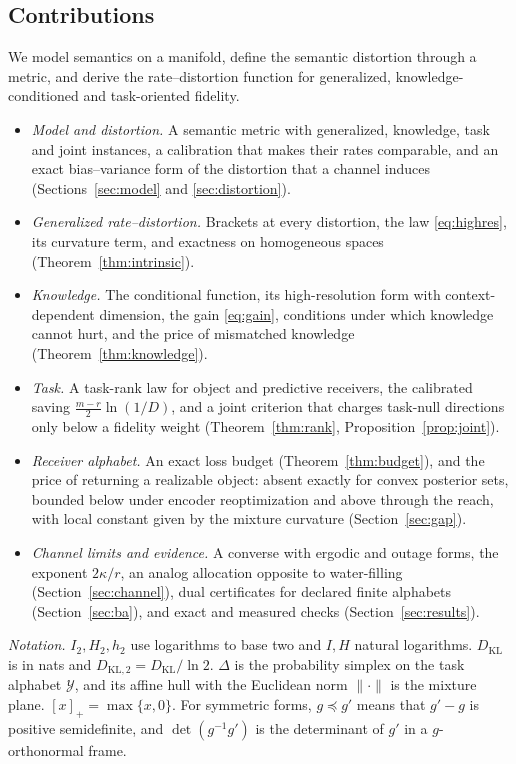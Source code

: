 \documentclass[10pt,journal]{IEEEtran}
\newcommand{\KL}{D_{\mathrm{KL}}}
\newcommand{\KLb}{D_{\mathrm{KL},2}}
\begin{document}
\subsection{Contributions}
We model semantics on a manifold, define the semantic distortion through a metric, and derive the rate--distortion function for generalized, knowledge-conditioned and task-oriented fidelity.
\begin{itemize}
\item \emph{Model and distortion.} A semantic metric with generalized, knowledge, task and joint instances, a calibration that makes their rates comparable, and an exact bias--variance form of the distortion that a channel induces (Sections~\ref{sec:model} and \ref{sec:distortion}).
\item \emph{Generalized rate--distortion.} Brackets at every distortion, the law \eqref{eq:highres}, its curvature term, and exactness on homogeneous spaces (Theorem~\ref{thm:intrinsic}).
\item \emph{Knowledge.} The conditional function, its high-resolution form with context-dependent dimension, the gain \eqref{eq:gain}, conditions under which knowledge cannot hurt, and the price of mismatched knowledge (Theorem~\ref{thm:knowledge}).
\item \emph{Task.} A task-rank law for object and predictive receivers, the calibrated saving $\frac{m-r}2\ln(1/D)$, and a joint criterion that charges task-null directions only below a fidelity weight (Theorem~\ref{thm:rank}, Proposition~\ref{prop:joint}).
\item \emph{Receiver alphabet.} An exact loss budget (Theorem~\ref{thm:budget}), and the price of returning a realizable object: absent exactly for convex posterior sets, bounded below under encoder reoptimization and above through the reach, with local constant given by the mixture curvature (Section~\ref{sec:gap}).
\item \emph{Channel limits and evidence.} A converse with ergodic and outage forms, the exponent $2\kappa/r$, an analog allocation opposite to water-filling (Section~\ref{sec:channel}), dual certificates for declared finite alphabets (Section~\ref{sec:ba}), and exact and measured checks (Section~\ref{sec:results}).
\end{itemize}

\emph{Notation.} $I_2,H_2,h_2$ use logarithms to base two and $I,H$ natural logarithms. $\KL$ is in nats and $\KLb=\KL/\ln2$. $\Delta$ is the probability simplex on the task alphabet $\mathcal Y$, and its affine hull with the Euclidean norm $\|\cdot\|$ is the mixture plane. $[x]_+=\max\{x,0\}$. For symmetric forms, $g\preceq g'$ means that $g'-g$ is positive semidefinite, and $\det(g^{-1}g')$ is the determinant of $g'$ in a $g$-orthonormal frame.
\end{document}
